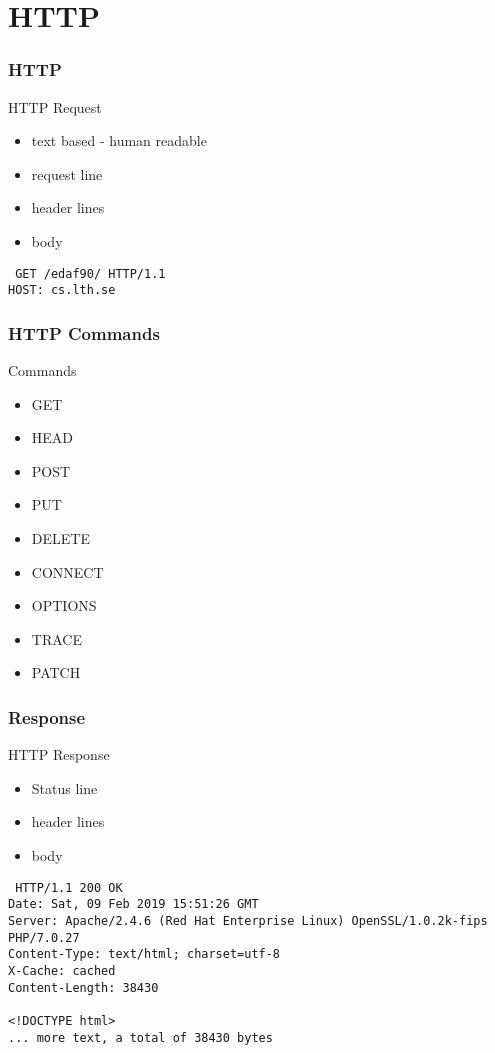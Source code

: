\section{HTTP}
\begin{frame}[fragile]\frametitle{HTTP}
\color{structure}
HTTP Request
\begin{itemize}\color{structure}
  \item text based - human readable
  \item request line
  \item header lines
  \item body
\end{itemize}
\texttt{
\noindent GET /edaf90/ HTTP/1.1\\
HOST: cs.lth.se
}
\end{frame}

\begin{frame}[fragile]\frametitle{HTTP Commands}
\color{structure}
Commands
\begin{itemize}\color{structure}
\item GET
\item HEAD
\item POST
\item PUT
\item DELETE
\item CONNECT
\item OPTIONS
\item TRACE
\item PATCH
\end{itemize}
\end{frame}

\begin{frame}[fragile]\frametitle{Response}
\color{structure}
HTTP Response
\begin{itemize}\color{structure}
\item  Status line
\item  header lines
\item  body
\end{itemize}

\texttt{
\noindent 
HTTP/1.1 200 OK
\\Date: Sat, 09 Feb 2019 15:51:26 GMT
\\Server: Apache/2.4.6 (Red Hat Enterprise Linux) OpenSSL/1.0.2k-fips PHP/7.0.27
\\Content-Type: text/html; charset=utf-8
\\X-Cache: cached
\\Content-Length: 38430
\\~ 
\\<!DOCTYPE html>
\\... more text, a total of 38430 bytes
}
\end{frame}

